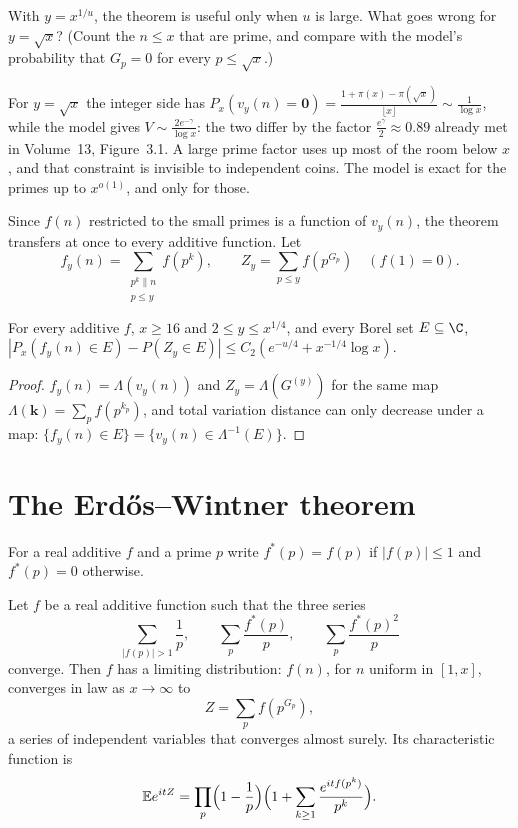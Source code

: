 \begin{think}
With $y=x^{1/u}$, the theorem is useful only when $u$ is large. What goes wrong for $y=\sqrt x$? (Count the $n\le x$ that are prime, and compare with the model's probability that $G_p=0$ for every $p\le\sqrt x$.)
\end{think}

For $y=\sqrt x$ the integer side has $P_x(v_y(n)=\mathbf0)=\frac{1+\pi(x)-\pi(\sqrt x)}{\lfloor x\rfloor}\sim\frac1{\log x}$, while the model gives $V\sim\frac{2e^{-\gamma}}{\log x}$: the two differ by the factor $\frac{e^\gamma}2\approx0.89$ already met in Volume~13, Figure~3.1. A large prime factor uses up most of the room below $x$, and that constraint is invisible to independent coins. The model is exact for the primes up to $x^{o(1)}$, and only for those.

Since $f(n)$ restricted to the small primes is a function of $v_y(n)$, the theorem transfers at once to every additive function. Let
\[
f_y(n)=\sum_{\substack{p^k\parallel n\\p\le y}}f(p^k),\qquad Z_y=\sum_{p\le y}f(p^{G_p})\quad(f(1)=0).
\]

\begin{corollary}\label{cor:kubiliusf}
For every additive $f$, $x\ge16$ and $2\le y\le x^{1/4}$, and every Borel set $E\subseteq\C$, $|P_x(f_y(n)\in E)-P(Z_y\in E)|\le C_2(e^{-u/4}+x^{-1/4}\log x)$.
\end{corollary}
\begin{proof}
$f_y(n)=\Lambda(v_y(n))$ and $Z_y=\Lambda(G^{(y)})$ for the same map $\Lambda(\mathbf k)=\sum_pf(p^{k_p})$, and total variation distance can only decrease under a map: $\{f_y(n)\in E\}=\{v_y(n)\in\Lambda^{-1}(E)\}$.
\end{proof}

\section{The Erd\H{o}s--Wintner theorem}

For a real additive $f$ and a prime $p$ write $f^*(p)=f(p)$ if $|f(p)|\le1$ and $f^*(p)=0$ otherwise.

\begin{theorem}\label{thm:erdoswintner}
Let $f$ be a real additive function such that the three series
\[
\sum_{|f(p)|>1}\frac1p,\qquad\sum_p\frac{f^*(p)}p,\qquad\sum_p\frac{f^*(p)^2}p
\]
converge. Then $f$ has a limiting distribution: $f(n)$, for $n$ uniform in $[1,x]$, converges in law as $x\to\infty$ to
\[
Z=\sum_pf(p^{G_p}),
\]
a series of independent variables that converges almost surely. Its characteristic function is
\[
\mathbb Ee^{itZ}=\prod_p\Bigl(1-\frac1p\Bigr)\Bigl(1+\sum_{k\ge1}\frac{e^{itf(p^k)}}{p^k}\Bigr).
\]
\end{theorem}

